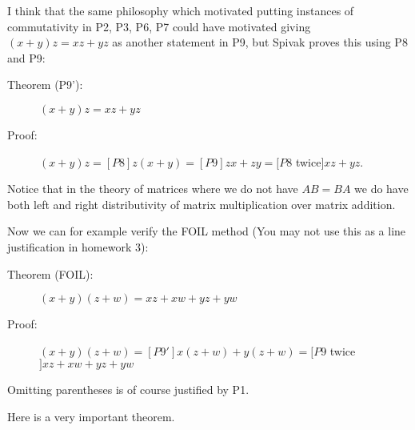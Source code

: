 \documentclass[12pt]{article}
\begin{document}
I think that the same philosophy which motivated putting instances of commutativity in P2, P3, P6, P7 could have motivated giving
$(x+y)z = xz + yz$ as another statement in P9, but Spivak proves this using P8 and P9:  

\begin{description}

\item[Theorem (P9'):]  $(x+y)z=xz+yz$

\item[Proof:]  $(x+y)z = [P8] z(x+y) = [P9] zx+zy = [P8 $ twice$]xz+yz$.

\end{description}

  Notice that in the theory of matrices where we do not have $AB=BA$ we do have both left and right distributivity of matrix multiplication over matrix addition.

Now we can for example verify the FOIL method (You may not use this as a line justification in homework 3):

\begin{description}

\item[Theorem (FOIL):]  $(x+y)(z+w) = xz+xw +yz+yw$

\item[Proof:]  $(x+y)(z+w) =[P9'] x(z+w) + y(z+w) = [P9 $ twice$] xz+xw+yz+yw$

\end{description}

Omitting parentheses is of course justified by P1.

Here is a very important theorem.
\end{document}
